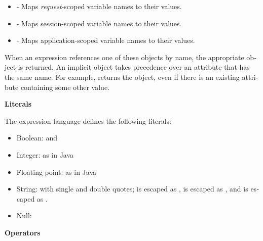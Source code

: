 \liststyleWWNumxii
\begin{itemize}
\item
{}\foreignlanguage{english}{
- Maps
}\foreignlanguage{english}{\textit{request}}\foreignlanguage{english}{{}-scoped
variable names to their values. }
\item
{}\foreignlanguage{english}{
- Maps session-scoped variable names to their values. }
\item
{}\foreignlanguage{english}{
- Maps application-scoped variable names to their values. }
\end{itemize}
\foreignlanguage{english}{When an expression references one of these
objects by name, the appropriate object is returned. An implicit object
takes precedence over an attribute that has the same name. For example,
}\foreignlanguage{english}{
returns the
}\foreignlanguage{english}{
object, even if there is an existing
}\foreignlanguage{english}{
attribute containing some other value.}

{\bfseries
\foreignlanguage{english}{Literals}\foreignlanguage{english}{ }}

\foreignlanguage{english}{The expression language defines the following
literals: }

\liststyleWWNumxiii
\begin{itemize}
\item Boolean:  and
\item Integer: as in Java 
\item \foreignlanguage{english}{Floating point: as in Java }
\item \foreignlanguage{english}{String: with single and double quotes;
}\foreignlanguage{english}{
is escaped as
}\foreignlanguage{english}{,
{\textquotesingle}}\foreignlanguage{english}{is escaped as
}\foreignlanguage{english}{{\textquotesingle},
and
}\foreignlanguage{english}{
is escaped as
}\foreignlanguage{english}{.
}
\item Null: 
\end{itemize}
{\bfseries
Operators }

